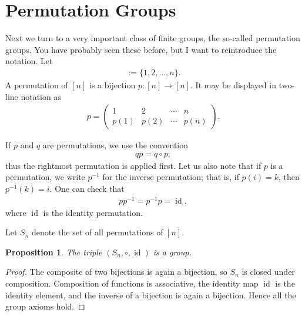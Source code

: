 \documentclass[reqno,11pt]{amsart}
\theoremstyle{definition}
\theoremstyle{plain}
\newtheorem{proposition}{Proposition}[section]
\theoremstyle{remark}
\numberwithin{equation}{section}
\newcommand{\id}{\operatorname{id}}
\newcommand{\be}{\begin{eqnarray}}
\newcommand{\ee}{\end{eqnarray}}
\begin{document}
\section{Permutation Groups}

Next we turn to a very important class of finite groups, the so-called permutation groups. You have probably seen these before, but I want to reintroduce the notation. Let 
\be
[n]:=\{1,2,\ldots,n\}.
\ee
A permutation of $[n]$ is a bijection $p\colon[n]\to[n]$. It may be displayed
in two-line notation as
\be
p=
\begin{pmatrix}
	1&2&\cdots&n\\
	p(1)&p(2)&\cdots&p(n)
\end{pmatrix}.
\ee

If $p$ and $q$ are permutations, we use the convention
\be
qp=q\circ p;
\ee
thus the rightmost permutation is applied first. Let us also note that if $p$
is a permutation, we write $p^{-1}$ for the inverse permutation; that is, if
$p(i)=k$, then $p^{-1}(k)=i$. One can check that
\be
pp^{-1}=p^{-1}p=\id,
\ee
where $\id$ is the identity permutation.

Let $S_n$ denote the set of all permutations of $[n]$.

\begin{proposition}
	The triple $(S_n,\circ,\id)$ is a group.
\end{proposition}

\begin{proof}
	The composite of two bijections is again a bijection, so $S_n$ is closed
	under composition. Composition of functions is associative, the identity
	map $\id$ is the identity element, and the inverse of a bijection is again a
	bijection. Hence all the group axioms hold.
\end{proof}
\end{document}
